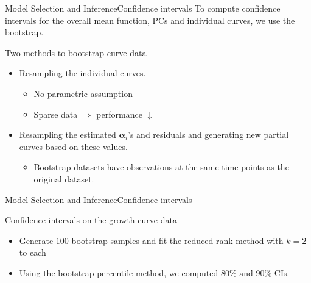 \documentclass{beamer}
\def \balpha {\boldsymbol{\alpha}}
\begin{document}
\begin{frame}{Model Selection and Inference}{Confidence intervals}
	To compute confidence intervals for the overall mean function, PCs and individual curves, we use the bootstrap.
	\begin{block}{Two methods to bootstrap curve data}
		\begin{itemize}
			\item {
				Resampling the individual curves.
			}
			\begin{itemize}
				\item {
					No parametric assumption
				}
				\item {
					Sparse data $\Rightarrow$ performance $\downarrow$
				}
			\end{itemize}
			\item {
				Resampling the estimated $\balpha_i$'s and residuals and generating new partial curves based on these values.
			}
			\begin{itemize}
				\item {
					Bootstrap datasets have observations at the same time points as the original dataset.
				}
			\end{itemize}
		\end{itemize}
	\end{block}
\end{frame}

\begin{frame}{Model Selection and Inference}{Confidence intervals}
	\begin{block}{Confidence intervals on the growth curve data}
		\begin{itemize}
			\item {
				Generate $100$ bootstrap samples and fit the reduced rank method with $k=2$ to each
			}
			\item {
				Using the bootstrap percentile method, we computed $80\% \text{ and } 90\%$ CIs.
			}
		\end{itemize}
	\end{block}
\end{frame}
\end{document}
